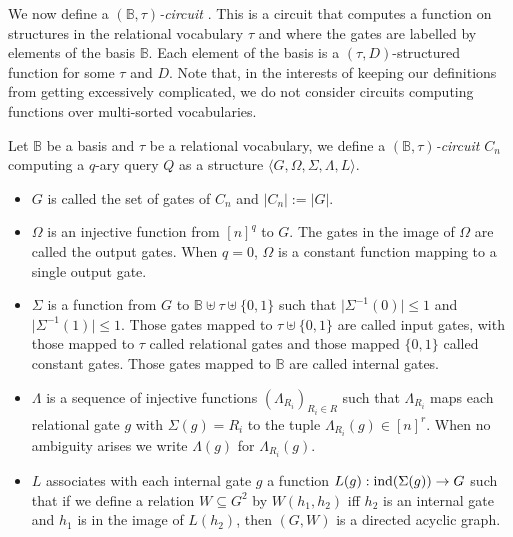 \documentclass[../paper.tex]{subfiles}
\begin{document}
We now define a \emph{$(\mathbb{B}, \tau)$-circuit} . This is a circuit that
computes a function on structures in the relational vocabulary $\tau$ and where
the gates are labelled by elements of the basis $\mathbb{B}$. Each element of
the basis is a $(\tau,D)$-structured function for some $\tau$ and $D$. Note
that, in the interests of keeping our definitions from getting excessively
complicated, we do not consider circuits computing functions over multi-sorted
vocabularies.

\begin{definition}
  Let $\mathbb{B}$ be a basis and $\tau$ be a relational vocabulary, we define a
  \emph{$(\mathbb{B}, \tau)$-circuit} $C_n$ computing a $q$-ary query $Q$ as a
  structure $\langle G, \Omega, \Sigma, \Lambda, L \rangle$.
  \begin{itemize}
    \setlength\itemsep{0mm}
  \item $G$ is called the set of gates of $C_n$ and $\vert C_n \vert := \vert G
    \vert$.
  \item $\Omega$ is an injective function from $[n]^q$ to $G$. The gates in the
    image of $\Omega$ are called the output gates. When $q = 0$, $\Omega$ is a
    constant function mapping to a single output gate.
  \item $\Sigma$ is a function from $G$ to $\mathbb{B} \uplus \tau \uplus
    \{0,1\} $ such that $\vert \Sigma^{-1} (0) \vert \leq 1$ and $\vert
    \Sigma^{-1} (1) \vert \leq 1$. Those gates mapped to $\tau \uplus \{0,1\}$
    are called input gates, with those mapped to $\tau$ called relational gates
    and those mapped $\{0,1\}$ called constant gates. Those gates mapped to
    $\mathbb{B}$ are called internal gates.
  \item $\Lambda$ is a sequence of injective functions $(\Lambda_{R_i})_{R_i \in
      R}$ such that $\Lambda_{R_i}$ maps each relational gate $g$ with $\Sigma
    (g) = R_i$ to the tuple $\Lambda_{R_i} (g) \in [n]^{r}$. When no ambiguity
    arises we write $\Lambda (g)$ for $\Lambda_{R_i} (g)$.
  \item $L$ associates with each internal gate $g$ a function $L(g):
    \text{\upshape ind}(\Sigma(g)) \rightarrow G$ such that if we define a relation $W
    \subseteq G^{2}$ by $W(h_1,h_2)$ iff $h_2$ is an internal gate and $h_1$ is
    in the image of $L(h_2)$, then $(G, W)$ is a directed acyclic graph.
  \end{itemize}
\end{definition}
\end{document}

